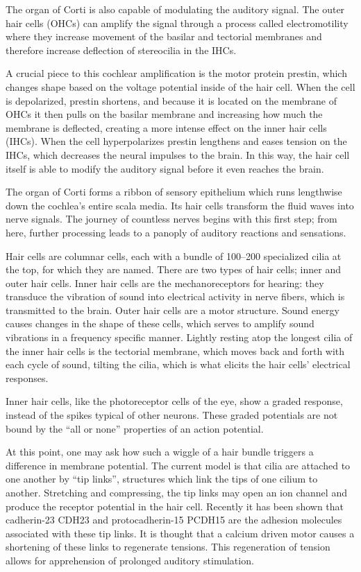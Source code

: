 The organ of Corti is also capable of modulating the auditory signal. The outer hair cells (OHCs) can amplify the signal through a process called electromotility where they increase movement of the basilar and tectorial membranes and therefore increase deflection of stereocilia in the IHCs.

A crucial piece to this cochlear amplification is the motor protein prestin, which changes shape based on the voltage potential inside of the hair cell. When the cell is depolarized, prestin shortens, and because it is located on the membrane of OHCs it then pulls on the basilar membrane and increasing how much the membrane is deflected, creating a more intense effect on the inner hair cells (IHCs). When the cell hyperpolarizes prestin lengthens and eases tension on the IHCs, which decreases the neural impulses to the brain. In this way, the hair cell itself is able to modify the auditory signal before it even reaches the brain.

The organ of Corti forms a ribbon of sensory epithelium which runs lengthwise down the cochlea's entire scala media. Its hair cells transform the fluid waves into nerve signals. The journey of countless nerves begins with this first step; from here, further processing leads to a panoply of auditory reactions and sensations.

Hair cells are columnar cells, each with a bundle of 100--200 specialized cilia at the top, for which they are named. There are two types of hair cells; inner and outer hair cells. Inner hair cells are the mechanoreceptors for hearing: they transduce the vibration of sound into electrical activity in nerve fibers, which is transmitted to the brain. Outer hair cells are a motor structure. Sound energy causes changes in the shape of these cells, which serves to amplify sound vibrations in a frequency specific manner. Lightly resting atop the longest cilia of the inner hair cells is the tectorial membrane, which moves back and forth with each cycle of sound, tilting the cilia, which is what elicits the hair cells' electrical responses.

Inner hair cells, like the photoreceptor cells of the eye, show a graded response, instead of the spikes typical of other neurons. These graded potentials are not bound by the ``all or none'' properties of an action potential.

At this point, one may ask how such a wiggle of a hair bundle triggers a difference in membrane potential. The current model is that cilia are attached to one another by ``tip links'', structures which link the tips of one cilium to another. Stretching and compressing, the tip links may open an ion channel and produce the receptor potential in the hair cell. Recently it has been shown that cadherin-23 CDH23 and protocadherin-15 PCDH15 are the adhesion molecules associated with these tip links. It is thought that a calcium driven motor causes a shortening of these links to regenerate tensions. This regeneration of tension allows for apprehension of prolonged auditory stimulation.

